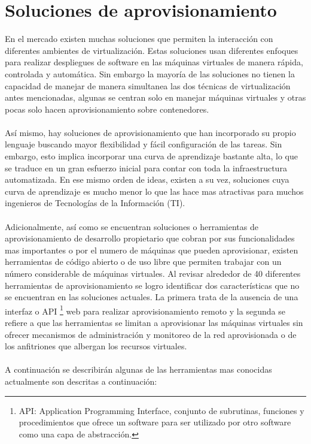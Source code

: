 \section{Soluciones de aprovisionamiento}
En el mercado existen muchas soluciones que permiten la interacción con diferentes ambientes de virtualización. Estas soluciones usan diferentes enfoques para realizar despliegues de software en las máquinas virtuales de manera rápida, controlada y automática. Sin embargo la mayoría de las soluciones no tienen la capacidad de manejar de manera simultanea las dos técnicas de virtualización antes mencionadas, algunas se centran solo en manejar máquinas virtuales y otras pocas solo hacen aprovisionamiento sobre contenedores.\\
\\
Así mismo, hay soluciones de aprovisionamiento que han incorporado su propio lenguaje buscando mayor flexibilidad y fácil configuración de las tareas. Sin embargo, esto implica incorporar una curva de aprendizaje bastante alta, lo que se traduce en un gran esfuerzo inicial para contar con toda la infraestructura automatizada. En ese mismo orden de ideas, existen a su vez, soluciones cuya curva de aprendizaje es mucho menor lo que las hace mas atractivas para muchos ingenieros de Tecnologías de la Información (TI).\\
\\
Adicionalmente, así como se encuentran soluciones o herramientas de aprovisionamiento de desarrollo propietario que cobran por sus funcionalidades mas importantes o por el numero de máquinas que pueden aprovisionar, existen herramientas de código abierto o de uso libre que permiten trabajar con un número considerable de máquinas virtuales. Al revisar alrededor de 40 diferentes herramientas de aprovisionamiento se logro identificar dos características que no se encuentran en las soluciones actuales. La primera trata de la ausencia de una interfaz o API \footnote{ API: Application Programming Interface, conjunto de subrutinas, funciones y procedimientos que ofrece un software para ser utilizado por otro software como una capa de abstracción.} web para realizar aprovisionamiento remoto y la segunda se refiere a que las herramientas se limitan a aprovisionar las máquinas virtuales sin ofrecer mecanismos de administración y monitoreo de la red aprovisionada o de los anfitriones que albergan los recursos virtuales.\\
\\
A continuación se describirán algunas de las herramientas mas conocidas actualmente son descritas a continuación:

